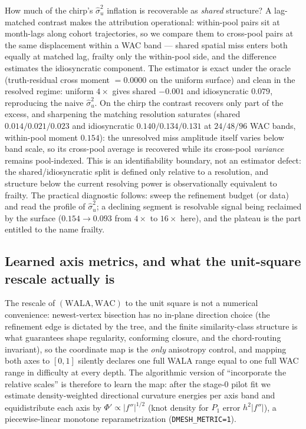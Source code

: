 \documentclass[11pt]{article}
\begin{document}
How much of the chirp's $\hat\sigma_u^2$ inflation is recoverable as
\emph{shared} structure? A lag-matched contrast makes the attribution
operational: within-pool pairs sit at month-lags along cohort trajectories, so
we compare them to cross-pool pairs at the same displacement within a WAC band
--- shared spatial miss enters both equally at matched lag, frailty only the
within-pool side, and the difference estimates the idiosyncratic component.
The estimator is exact under the oracle (truth-residual cross moment $=0.0000$
on the uniform surface) and clean in the resolved regime: uniform $4\times$
gives shared $-0.001$ and idiosyncratic $0.079$, reproducing the naive
$\hat\sigma_u^2$. On the chirp the contrast recovers only part of the excess,
and sharpening the matching resolution saturates (shared $0.014/0.021/0.023$
and idiosyncratic $0.140/0.134/0.131$ at $24/48/96$ WAC bands, within-pool
moment $0.154$): the unresolved miss amplitude itself varies below band scale,
so its cross-pool average is recovered while its cross-pool \emph{variance}
remains pool-indexed. This is an identifiability boundary, not an estimator
defect: the shared/idiosyncratic split is defined only relative to a
resolution, and structure below the current resolving power is observationally
equivalent to frailty. The practical diagnostic follows: sweep the refinement
budget (or data) and read the profile of $\hat\sigma_u^2$; a declining
segment is resolvable signal being reclaimed by the surface ($0.154\to0.093$
from $4\times$ to $16\times$ here), and the plateau is the part entitled to
the name frailty.

\subsection{Learned axis metrics, and what the unit-square rescale actually is}
\label{sec:metric}

The rescale of $(\text{WALA},\text{WAC})$ to the unit square is not a numerical
convenience: newest-vertex bisection has no in-plane direction choice (the
refinement edge is dictated by the tree, and the finite similarity-class
structure is what guarantees shape regularity, conforming closure, and the
chord-routing invariant), so the coordinate map is the \emph{only} anisotropy
control, and mapping both axes to $[0,1]$ silently declares one full WALA range
equal to one full WAC range in difficulty at every depth. The algorithmic
version of ``incorporate the relative scales'' is therefore to learn the map:
after the stage-0 pilot fit we estimate density-weighted directional curvature
energies per axis band and equidistribute each axis by
$\Phi'\propto|f''|^{1/2}$ (knot density for $P_1$ error $h^2|f''|$), a
piecewise-linear monotone reparametrization (\texttt{DMESH\_METRIC=1}).
\end{document}

